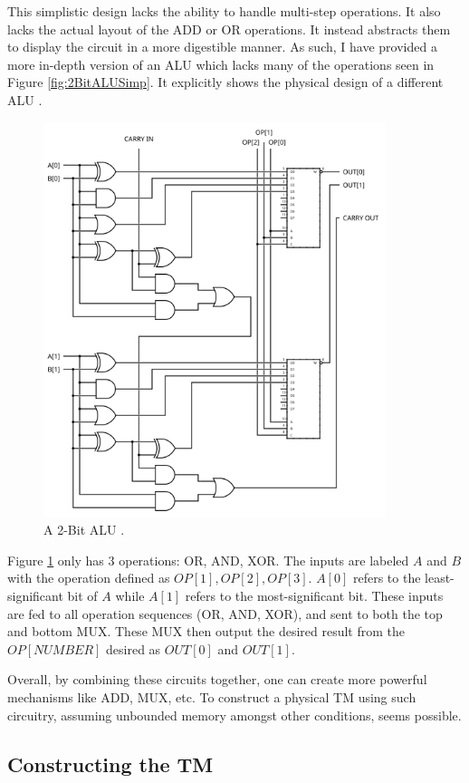 This simplistic design lacks the ability to handle multi-step operations.
It also lacks the actual layout of the ADD or OR operations.
It instead abstracts them to display the circuit in a more digestible manner.
As such, I have provided a more in-depth version of an ALU which lacks many of the operations seen in Figure \ref{fig:2BitALUSimp}.
It explicitly shows the physical design of a different ALU \cite{ALUImg}.

\begin{figure}[htb]
    \centering
    \includegraphics[width=10cm]{Images/2-bit_ALU.svg.png}
       \caption{A 2-Bit ALU \cite{ALUImg}.}
           \label{fig:2BitALUAdv}
\end{figure}

Figure \ref{fig:2BitALUAdv} only has 3 operations: OR, AND, XOR.
The inputs are labeled $A$ and $B$ with the operation defined as $OP[1], OP[2], OP[3]$.
$A[0]$ refers to the least-significant bit of $A$ while $A[1]$ refers to the most-significant bit.
These inputs are fed to all operation sequences (OR, AND, XOR), and sent to both the top and bottom MUX.
These MUX then output the desired result from the $OP[NUMBER]$ desired as $OUT[0]$ and $OUT[1]$.

Overall, by combining these circuits together, one can create more powerful mechanisms like ADD, MUX, etc.
To construct a physical TM using such circuitry, assuming unbounded memory amongst other conditions, seems possible.

\subsection{Constructing the TM}\label{subsec:CreateTM}

